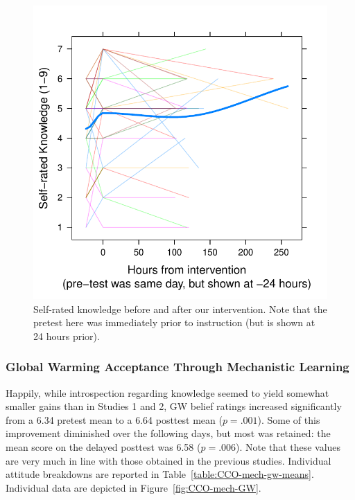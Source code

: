 \begin{figure}
    \centering
    \includegraphics{CCO-mech-self.pdf}
    \caption{Self-rated knowledge before and after our intervention. Note that the
        pretest here was immediately prior to instruction (but is shown at 24
        hours prior).}
    \label{fig:CCO-mech-self}
\end{figure}

\subsubsection{Global Warming Acceptance Through Mechanistic Learning}

Happily, while introspection regarding knowledge seemed to yield somewhat
smaller gains than in Studies 1 and 2, GW belief ratings increased significantly
from a 6.34 pretest mean to a 6.64 posttest mean ($p=.001$). Some of this
improvement diminished over the following days, but most was retained: the mean
score on the delayed posttest was 6.58 ($p=.006$). Note that these values are
very much in line with those obtained in the previous studies. Individual
attitude breakdowns are reported in Table~\ref{table:CCO-mech-gw-means}.
Individual data are depicted in Figure~\ref{fig:CCO-mech-GW}.

